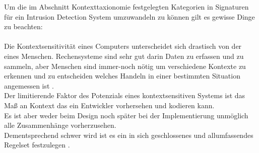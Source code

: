 Um die im Abschnitt Kontexttaxionomie festgelegten Kategorien in Signaturen für ein Intrusion Detection System umzuwandeln zu können gilt es gewisse Dinge zu beachten:\\\\ Die Kontextsensitivität eines Computers unterscheidet sich drastisch von der eines Menschen. Rechensysteme sind sehr gut darin Daten zu erfassen und zu sammeln, aber Menschen sind immer-noch nötig um verschiedene Kontexte zu erkennen und zu entscheiden welches Handeln in einer bestimmten Situation angemessen ist \cite{dey_understanding_2001}.\\
Der limitierende Faktor des Potenzials eines kontextsensitiven Systems ist das Maß an Kontext das ein Entwickler vorhersehen und kodieren kann.\\
Es ist aber weder beim Design noch später bei der Implementierung unmöglich alle Zusammenhänge vorherzusehen.\\
Dementsprechend schwer wird ist es ein in sich geschlossenes und allumfassendes Regelset festzulegen \cite{perera_context_2014}.\\\\
